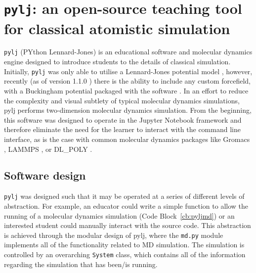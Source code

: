\section{\texttt{pylj}: an open-source teaching tool for classical atomistic simulation}

\texttt{pylj} (PYthon Lennard-Jones) \cite{mccluskey_pylj_2018,mccluskey_arm61/pylj_2019-2} is an educational software and molecular dynamics engine designed to introduce students to the details of classical simulation.
Initially, \texttt{pylj} was only able to utilise a Lennard-Jones potential model \cite{lennard-jones_determination_1924}, however, recently (as of version 1.1.0 \cite{mccluskey_arm61/pylj_2018}) there is the ability to include any custom forcefield, with a Buckingham potential packaged with the software \cite{buckingham_classical_1938}.
In an effort to reduce the complexity and visual subtlety of typical molecular dynamics simulations, pylj performs two-dimension molecular dynamics simulation.
From the beginning, this software was designed to operate in the Jupyter Notebook framework and therefore eliminate the need for the learner to interact with the command line interface, as is the case with common molecular dynamics packages like Gromacs \cite{berendsen_gromacs_1995}, LAMMPS \cite{plimpton_fast_1995}, or DL\_POLY \cite{smith_dl_poly_2002}.

\subsection{Software design}
\texttt{pylj} was designed such that it may be operated at a series of different levels of abstraction.
For example, an educator could write a simple function to allow the running of a molecular dynamics simulation (Code Block~\ref{cb:pyljmd}) or an interested student could manually interact with the source code.
This abstraction is achieved through the modular design of pylj, where the \texttt{md.py} module implements all of the functionality related to MD simulation.
The simulation is controlled by an overarching \texttt{System} class, which contains all of the information regarding the simulation that has been/is running.
%
\begin{figure}
    \centering
        
\end{figure}
%

